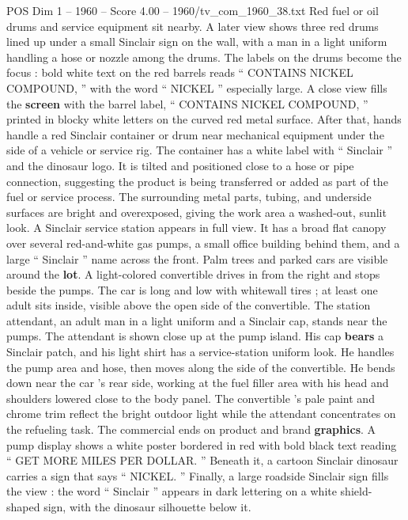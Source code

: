 \begin{textsample}{POS Dim 1 – 1960 – Score 4.00 – 1960/tv\_com\_1960\_38.txt}
Red fuel or oil drums and service equipment sit nearby.
A later view shows three red drums lined up under a small Sinclair sign on the wall, with a man in a light uniform handling a hose or nozzle among the drums.
The labels on the drums become the focus : bold white text on the red barrels reads “ CONTAINS NICKEL COMPOUND, ” with the word “ NICKEL ” especially large.
A close view fills the \textbf{screen} with the barrel label, “ CONTAINS NICKEL COMPOUND, ” printed in blocky white letters on the curved red metal surface.
After that, hands handle a red Sinclair container or drum near mechanical equipment under the side of a vehicle or service rig.
The container has a white label with “ Sinclair ” and the dinosaur logo.
It is tilted and positioned close to a hose or pipe connection, suggesting the product is being transferred or added as part of the fuel or service process.
The surrounding metal parts, tubing, and underside surfaces are bright and overexposed, giving the work area a washed-out, sunlit look.
A Sinclair service station appears in full view.
It has a broad flat canopy over several red-and-white gas pumps, a small office building behind them, and a large “ Sinclair ” name across the front.
Palm trees and parked cars are visible around the \textbf{lot}.
A light-colored convertible drives in from the right and stops beside the pumps.
The car is long and low with whitewall tires ; at least one adult sits inside, visible above the open side of the convertible.
The station attendant, an adult man in a light uniform and a Sinclair cap, stands near the pumps.
The attendant is shown close up at the pump island.
His cap \textbf{bears} a Sinclair patch, and his light shirt has a service-station uniform look.
He handles the pump area and hose, then moves along the side of the convertible.
He bends down near the car ’s rear side, working at the fuel filler area with his head and shoulders lowered close to the body panel.
The convertible ’s pale paint and chrome trim reflect the bright outdoor light while the attendant concentrates on the refueling task.
The commercial ends on product and brand \textbf{graphics}.
A pump display shows a white poster bordered in red with bold black text reading “ GET MORE MILES PER DOLLAR. ” Beneath it, a cartoon Sinclair dinosaur carries a sign that says “ NICKEL. ” Finally, a large roadside Sinclair sign fills the view : the word “ Sinclair ” appears in dark lettering on a white shield-shaped sign, with the dinosaur silhouette below it.

\end{textsample}
